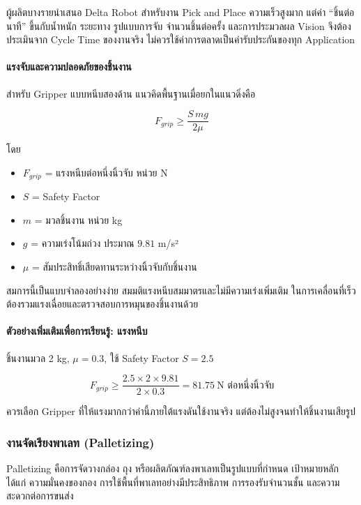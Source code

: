 ผู้ผลิตบางรายนำเสนอ Delta Robot สำหรับงาน Pick and Place ความเร็วสูงมาก แต่ค่า “ชิ้นต่อนาที” ขึ้นกับน้ำหนัก ระยะทาง รูปแบบการจับ จำนวนชิ้นต่อครั้ง และการประมวลผล Vision จึงต้องประเมินจาก Cycle Time ของงานจริง ไม่ควรใช้ค่าการตลาดเป็นค่ารับประกันของทุก Application

\paragraph{แรงจับและความปลอดภัยของชิ้นงาน}

สำหรับ Gripper แบบหนีบสองด้าน แนวคิดพื้นฐานเมื่อยกในแนวดิ่งคือ

\[
F_{grip}\geq \frac{S\,mg}{2\mu}
\]

โดย

\begin{itemize}
    \item $F_{grip}$ = แรงหนีบต่อหนึ่งนิ้วจับ หน่วย N
    \item $S$ = Safety Factor
    \item $m$ = มวลชิ้นงาน หน่วย kg
    \item $g$ = ความเร่งโน้มถ่วง ประมาณ $9.81$ m/s²
    \item $\mu$ = สัมประสิทธิ์เสียดทานระหว่างนิ้วจับกับชิ้นงาน
\end{itemize}

สมการนี้เป็นแบบจำลองอย่างง่าย สมมติแรงหนีบสมมาตรและไม่มีความเร่งเพิ่มเติม ในการเคลื่อนที่เร็ว ต้องรวมแรงเฉื่อยและตรวจสอบการหมุนของชิ้นงานด้วย

\paragraph{ตัวอย่างเพิ่มเติมเพื่อการเรียนรู้: แรงหนีบ}

ชิ้นงานมวล 2 kg, $\mu=0.3$, ใช้ Safety Factor $S=2.5$

\[
F_{grip}\geq\frac{2.5\times2\times9.81}{2\times0.3}=81.75\ \text{N ต่อหนึ่งนิ้วจับ}
\]

ควรเลือก Gripper ที่ให้แรงมากกว่าค่านี้ภายใต้แรงดันใช้งานจริง แต่ต้องไม่สูงจนทำให้ชิ้นงานเสียรูป

\subsubsection{งานจัดเรียงพาเลท (Palletizing)}

Palletizing คือการจัดวางกล่อง ถุง หรือผลิตภัณฑ์ลงพาเลทเป็นรูปแบบที่กำหนด เป้าหมายหลัก ได้แก่ ความมั่นคงของกอง การใช้พื้นที่พาเลทอย่างมีประสิทธิภาพ การรองรับจำนวนชั้น และความสะดวกต่อการขนส่ง

